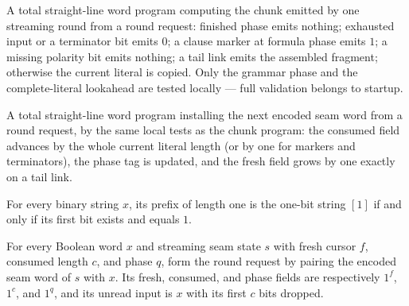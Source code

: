 \begin{definition}
\label{Complexity.satReqEmit}
\leanok
{}
A total straight-line word program computing the chunk emitted by one streaming
round from a round request: finished phase emits nothing; exhausted input or a
terminator bit emits $0$; a clause marker at formula phase emits $1$; a missing
polarity bit emits nothing; a tail link emits the assembled fragment; otherwise
the current literal is copied. Only the grammar phase and the complete-literal
lookahead are tested locally — full validation belongs to startup.
\end{definition}

\begin{definition}
\label{Complexity.satReqStep}
\leanok
{}
A total straight-line word program installing the next encoded seam word from a
round request, by the same local tests as the chunk program: the consumed field
advances by the whole current literal length (or by one for markers and
terminators), the phase tag is updated, and the fresh field grows by one exactly
on a tail link.
\end{definition}

\begin{lemma}
\label{Complexity.sat_take_one_true}
\leanok
{}
For every binary string $x$, its prefix of length one is the one-bit string $[1]$ if and
only if its first bit exists and equals $1$.
\end{lemma}

\begin{lemma}
\label{Complexity.satReq_fields}
\leanok
{}
For every Boolean word $x$ and streaming seam state $s$ with fresh cursor $f$, consumed
length $c$, and phase $q$, form the round request by pairing the encoded seam word of
$s$ with $x$. Its fresh, consumed, and phase fields are respectively $1^f$, $1^c$, and
$1^q$, and its unread input is $x$ with its first $c$ bits dropped.
\end{lemma}

